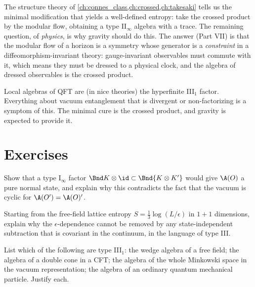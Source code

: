 The structure theory of \cref{ch:connes_class,ch:crossed,ch:takesaki} tells us the minimal modification that yields a well-defined entropy: take the crossed product by the modular flow, obtaining a type II$_\infty$ algebra with a trace. The remaining question, of \emph{physics}, is why gravity should do this. The answer (Part VII) is that the modular flow of a horizon is a symmetry whose generator is a \emph{constraint} in a diffeomorphism-invariant theory: gauge-invariant observables must commute with it, which means they must be dressed to a physical clock, and the algebra of dressed observables is the crossed product.

\begin{keyidea}
Local algebras of QFT are (in nice theories) the hyperfinite III$_1$ factor. Everything about vacuum entanglement that is divergent or non-factorizing is a symptom of this. The minimal cure is the crossed product, and gravity is expected to provide it.
\end{keyidea}

\section*{Exercises}
\begin{exercise}
Show that a type I$_\infty$ factor $\Bnd K\otimes\id\subset\Bnd{K\otimes K'}$ would give $\A(O)$ a pure normal state, and explain why this contradicts the fact that the vacuum is cyclic for $\A(O')=\A(O)'$.
\end{exercise}
\begin{exercise}
Starting from the free-field lattice entropy $S=\frac13\log(L/\epsilon)$ in $1+1$ dimensions, explain why the $\epsilon$-dependence cannot be removed by any state-independent subtraction that is covariant in the continuum, in the language of type III.
\end{exercise}
\begin{exercise}
List which of the following are type III$_1$: the wedge algebra of a free field; the algebra of a double cone in a CFT; the algebra of the whole Minkowski space in the vacuum representation; the algebra of an ordinary quantum mechanical particle. Justify each.
\end{exercise}
